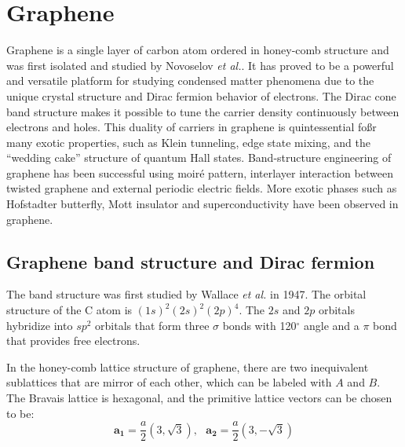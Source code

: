 \documentclass[pdflatex, sectionletters, 12pt]{pittetd}    %
\begin{document}
\section{Graphene}

Graphene is a single layer of carbon atom ordered in honey-comb structure and was first isolated and studied by Novoselov \textit{et al.}\cite{novoselov2004electric}. It has proved to be a powerful and versatile platform for studying condensed matter phenomena due to the unique crystal structure and Dirac fermion behavior of electrons\cite{wilson2006electrons}. The Dirac cone band structure makes it possible to tune the carrier density continuously between electrons and holes. This duality of carriers in graphene is quintessential foßr many exotic properties, such as Klein tunneling\cite{allain2011klein, katsnelson2006chiral, young2009quantum, shytov2008klein}, edge state mixing\cite{williams2007quantum, abanin2007quantized, lohmann2009four, amet2014selective}, and the ``wedding cake'' structure of quantum Hall states\cite{gutierrez2018interaction}. Band-structure engineering of graphene has been successful using moir{\'e} pattern\cite{dean2013hofstadter, hunt2013massive, ponomarenko2013cloing}, interlayer interaction between twisted graphene\cite{cao2018correlated, cao2018unconventional} and external periodic electric fields\cite{forsythe2018band}. More exotic phases such as Hofstadter butterfly\cite{dean2013hofstadter, hunt2013massive, forsythe2018band}, Mott insulator\cite{cao2018correlated} and superconductivity\cite{cao2018unconventional} have been observed in graphene.

\subsection{Graphene band structure and Dirac fermion}

The band structure was first studied by Wallace \textit{et al.} in 1947\cite{wallace1947band}. The orbital structure of the C atom is $(1s)^2(2s)^2(2p)^4$. The $2s$ and $2p$ orbitals hybridize into $sp^2$ orbitals that form three $\sigma$ bonds with 120$^{\circ}$ angle and a $\pi$ bond that provides free electrons. 

In the honey-comb lattice structure of graphene, there are two inequivalent sublattices that are mirror of each other, which can be labeled with $A$ and $B$. The Bravais lattice is hexagonal, and the primitive lattice vectors can be chosen to be: 
$$\mathbf{a_1} = \frac{a}{2}\left(3, \sqrt{3}\right), \ \ \ \mathbf{a_2} = \frac{a}{2}\left(3, -\sqrt{3}\right)$$
\end{document}
